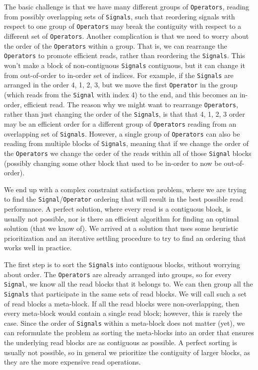 \documentclass{article}
\begin{document}

The basic challenge is that we have many different groups of \texttt{Operators}, reading from possibly overlapping sets of \texttt{Signals}, such that reordering signals with respect to one group of \texttt{Operators} may break the contiguity with respect to a different set of \texttt{Operators}.  Another complication is that we need to worry about the order of the \texttt{Operators} within a group. That is, we can rearrange the \texttt{Operators} to promote efficient reads, rather than reordering the \texttt{Signals}.  This won't make a block of non-contiguous \texttt{Signals} contiguous, but it can change it from out-of-order to in-order set of indices.  For example, if the \texttt{Signals} are arranged in the order 4, 1, 2, 3, but we move the first \texttt{Operator} in the group (which reads from the \texttt{Signal} with index 4) to the end, and this becomes an in-order, efficient read.  The reason why we might want to rearrange \texttt{Operators}, rather than just changing the order of the \texttt{Signals}, is that that 4, 1, 2, 3 order may be an efficient order for a different group of \texttt{Operators} reading from an overlapping set of \texttt{Signals}.  However, a single group of \texttt{Operators} can also be reading from multiple blocks of \texttt{Signals}, meaning that if we change the order of the \texttt{Operators} we change the order of the reads within all of those \texttt{Signal} blocks (possibly changing some other block that used to be in-order to now be out-of-order).

We end up with a complex constraint satisfaction problem, where we are trying to find the \texttt{Signal}/\texttt{Operator} ordering that will result in the best possible read performance. A perfect solution, where every read is a contiguous block, is usually not possible, nor is there an efficient algorithm for finding an optimal solution (that we know of).  We arrived at a solution that uses some heuristic prioritization and an iterative settling procedure to try to find an ordering that works well in practice.  

The first step is to sort the \texttt{Signals} into contiguous blocks, without worrying about order.  The \texttt{Operators} are already arranged into groups, so for every \texttt{Signal}, we know all the read blocks that it belongs to.  We can then group all the \texttt{Signals} that participate in the same sets of read blocks.  We will call such a set of read blocks a meta-block.  If all the read blocks were non-overlapping, then every meta-block would contain a single read block; however, this is rarely the case.  Since the order of \texttt{Signals} within a meta-block does not matter (yet), we can reformulate the problem as sorting the meta-blocks into an order that ensures the underlying read blocks are as contiguous as possible.  A perfect sorting is usually not possible, so in general we prioritize the contiguity of larger blocks, as they are the more expensive read operations.
\end{document}
